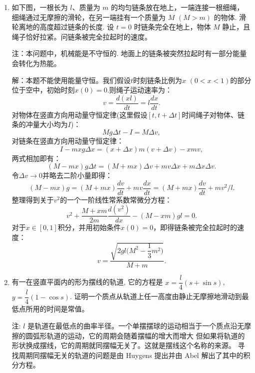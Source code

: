 \begin{enumerate}
    \item 如下图，一根长为 $l$、质量为 $m$ 的均匀链条放在地上，一端连接一根细绳，
    细绳通过无摩擦的滑轮，在另一端挂有一个质量为 $M$ $(M>m)$ 的物体. 滑轮离地的高度超过链条的长度. 
    设 $t=0$ 时链条完全在地上，物体 $M$ 静止，且绳子恰好拉紧。问链条被完全拉起时的速度。
    注：本问题中，机械能是不守恒的. 地面上的链条被突然拉起时有一部分能量会转化为热能。

    解：本题不能使用能量守恒。我们假设$t$时刻链条比例为$x$ $(0<x<1)$的部分
    位于空中，初始时刻$x(0)=0$.则绳子运动速率为：
    $$v=\frac{d(xl)}{dt}=l\frac{dx}{dt}.$$
    对物体在竖直方向用动量守恒定律(这里假设$[t,t+\Delta t]$时间绳子对物体、链条的冲量大小均为$I$)：
    $$Mg\Delta t-I=M\Delta v,$$
    对链条在竖直方向用动量守恒定律：
    $$I-mxg\Delta x=(x+\Delta x)m(v+\Delta v)-xmv,$$
    两式相加即有：
    $$(M-mx)g\Delta t=(M+mx)\Delta v+mv\Delta x+m\Delta x\Delta v.$$
    令$\Delta v\rightarrow 0$并略去二阶小量即得：
    $$(M-mx)g=(M+mx)\frac{dv}{dt}+mv\frac{dx}{dt}=(M+mx)\frac{dv}{dt}+mv^2/l.$$
    整理得到关于$v^2$的一个一阶线性常系数常微分方程：
    $$v^2+\frac{M+xm}{2m}\frac{d(v^2)}{dx}-(M-xm)gl=0.$$
    对于$x\in[0,1]$积分，并用初始条件$x(0)=0$，即得链条被完全拉起时的速度：
    $$v=\frac{\sqrt{2gl\big(M^2-\dfrac13 m^2\big)}}{M+m}.$$

    \item 有一在竖直平面内的形为摆线的轨道, 它的方程是 $x=\dfrac{l}{4}(s+\sin s)$, $y=\dfrac{l}{4}(1-\cos s)$. 
    证明一个质点从轨道上任一高度由静止无摩擦地滑动到最低点所用的时间是常值。

    注: $l$ 是轨道在最低点的曲率半径。一个单摆摆球的运动相当于一个质点沿无摩擦的圆弧形轨道的运动，它的周期会随着摆幅的增大而增大 但如果将轨道的形状换成摆线，它的周期就同摆幅无关了。这就是摆线这个名称的来源。
    寻找周期同摆幅无关的轨道的问题是由 Huygens 提出并由 Abel 解出了其中的积分方程。


\end{enumerate}
